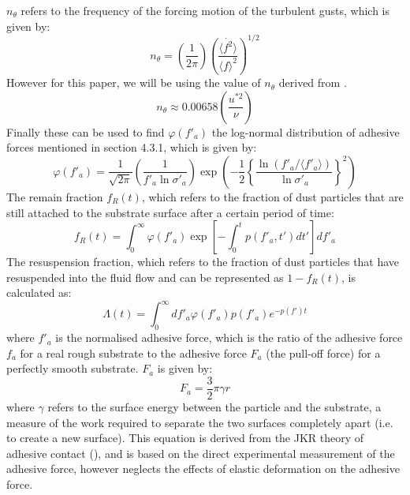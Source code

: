 \documentclass{article}
\begin{document}
\(n_\theta\) refers to the frequency of the forcing motion of the turbulent gusts, which is given by: 
\begin{equation} \label{11}
n_\theta = \left( \frac{1}{2\pi} \right) \left( \frac{\langle \dot{f^2} \rangle}{\langle f \rangle^2} \right)^{1/2}
\end{equation}
However for this paper, we will be using the value of \(n_\theta\) derived from \cite{HALLD1988}. 
\begin{equation} \label{12}
    n_\theta \approx 0.00658 \left( {\frac{u^{*2}}{\nu}}\right)
\end{equation}
Finally these can be used to find \(\varphi(f'_a)\) the log-normal distribution of adhesive forces mentioned in section 4.3.1, which is given by: 
\begin{equation} \label{13}
    \varphi(f'_a) = \frac{1}{\sqrt{2\pi}} \left( \frac{1}{f'_a \ln \sigma'_a} \right) \exp \left( -\frac{1}{2} \left\{ \frac{\ln( f'_a / \langle f'_a \rangle)}{\ln \sigma'_a} \right\}^2 \right)
\end{equation}
The remain fraction \(f_R(t)\), which refers to the fraction of dust particles that are still attached to the substrate surface after a certain period of time: 
\begin{equation}\label{14}
    f_R(t) = \int_{0}^{\infty} \varphi(f'_a) \exp \left[ -\int_0^t p(f'_a, t') dt' \right] df'_a
\end{equation}
The resuspension fraction, which refers to the fraction of dust particles that have resuspended into the fluid flow and can be represented as \(1-f_R(t)\), is calculated as: 
\begin{equation} \label{15}
    \Lambda (t) = \int_0^\infty df'_a \varphi (f'_a) p(f'_a) e^{-p(f')t}
\end{equation}
where \(f'_a\) is the normalised adhesive force, which is the ratio of the adhesive force \(f_a\) for a real rough substrate to the adhesive force \(F_a\) (the pull-off force) for a perfectly smooth substrate. \(F_a\) is given by: 
\begin{equation} \label{16}
    F_a = \frac{3}{2} \pi \gamma r
\end{equation}
where \(\gamma\) refers to the surface energy between the particle and the substrate, a measure of the work required to separate the two surfaces completely apart (i.e. to create a new surface). This equation is derived from the JKR theory of adhesive contact (\cite{borodich2014hertz}), and is based on the direct experimental measurement of the adhesive force, however neglects the effects of elastic deformation on the adhesive force. 
\end{document}
